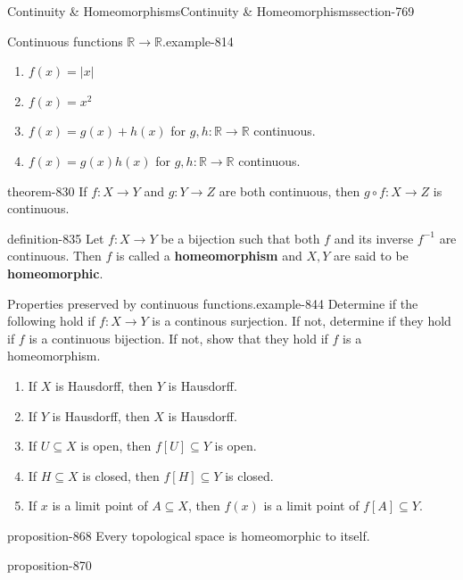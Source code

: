 \documentclass[oneside,10pt,]{article}
\newcommand{\terminology}[1]{\textbf{#1}}
\newcommand{\mb}{\mathbb}
\begin{document}
\begin{sectionptx}{Continuity \& Homeomorphisms}{}{Continuity \& Homeomorphisms}{}{}{section-769}
\begin{example}{Continuous functions \(\mb R\to\mb R\).}{example-814}
\begin{enumerate}
\item\hypertarget{li-820}{}\(f(x)=|x|\)%
\item\hypertarget{li-822}{}\(f(x)=x^2\)%
\item\hypertarget{li-824}{}\(f(x)=g(x)+h(x)\) for \(g,h:\mb R\to\mb R\) continuous.%
\item\hypertarget{li-827}{}\(f(x)=g(x)h(x)\) for \(g,h:\mb R\to\mb R\) continuous.%
\end{enumerate}
\end{example}
\begin{theorem}{}{}{theorem-830}%
\hypertarget{p-831}{}%
If \(f:X\to Y\) and \(g:Y\to Z\) are both continuous, then \(g\circ f:X\to Z\) is continuous.%
\end{theorem}
\begin{definition}{}{definition-835}%
\hypertarget{p-836}{}%
Let \(f:X\to Y\) be a bijection such that both \(f\) and its inverse \(f^{-1}\) are continuous. Then \(f\) is called a \terminology{homeomorphism} and \(X,Y\) are said to be \terminology{homeomorphic}.%
\end{definition}
\begin{example}{Properties preserved by continuous functions.}{example-844}%
\hypertarget{p-846}{}%
Determine if the following hold if \(f:X\to Y\) is a continous surjection. If not, determine if they hold if \(f\) is a continuous bijection. If not, show that they hold if \(f\) is a homeomorphism.%
\leavevmode%
\begin{enumerate}
\item\hypertarget{li-851}{}If \(X\) is Hausdorff, then \(Y\) is Hausdorff.%
\item\hypertarget{li-854}{}If \(Y\) is Hausdorff, then \(X\) is Hausdorff.%
\item\hypertarget{li-857}{}If \(U\subseteq X\) is open, then \(f[U]\subseteq Y\) is open.%
\item\hypertarget{li-860}{}If \(H\subseteq X\) is closed, then \(f[H]\subseteq Y\) is closed.%
\item\hypertarget{li-863}{}If \(x\) is a limit point of \(A\subseteq X\), then \(f(x)\) is a limit point of \(f[A]\subseteq Y\).%
\end{enumerate}
\end{example}
\begin{proposition}{}{}{proposition-868}%
\hypertarget{p-869}{}%
Every topological space is homeomorphic to itself.%
\end{proposition}
\begin{proposition}{}{}{proposition-870}%

\end{proposition}
\end{sectionptx}
\end{document}
